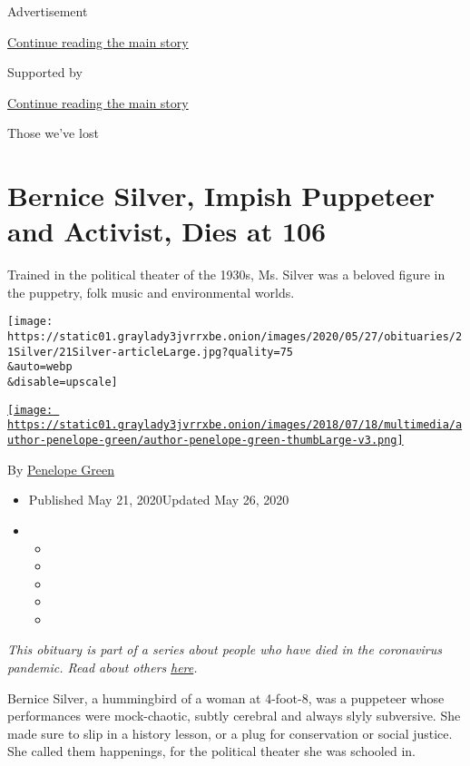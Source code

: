 Advertisement

\protect\hyperlink{after-top}{Continue reading the main story}

Supported by

\protect\hyperlink{after-sponsor}{Continue reading the main story}

Those we've lost

\hypertarget{bernice-silver-impish-puppeteer-and-activist-dies-at-106}{%
\section{Bernice Silver, Impish Puppeteer and Activist, Dies at
106}\label{bernice-silver-impish-puppeteer-and-activist-dies-at-106}}

Trained in the political theater of the 1930s, Ms. Silver was a beloved
figure in the puppetry, folk music and environmental worlds.

\texttt{[image: https://static01.graylady3jvrrxbe.onion/images/2020/05/27/obituaries/21Silver/21Silver-articleLarge.jpg?quality=75\\\&auto=webp\\\&disable=upscale]}

\href{https://www.nytimes3xbfgragh.onion/by/penelope-green}{\texttt{[image: https://static01.graylady3jvrrxbe.onion/images/2018/07/18/multimedia/author-penelope-green/author-penelope-green-thumbLarge-v3.png]}}

By \href{https://www.nytimes3xbfgragh.onion/by/penelope-green}{Penelope
Green}

\begin{itemize}
\item
  Published May 21, 2020Updated May 26, 2020
\item
  \begin{itemize}
  \item
  \item
  \item
  \item
  \item
  \end{itemize}
\end{itemize}

\emph{This obituary is part of a series about people who have died in
the coronavirus pandemic. Read about others}
\href{https://www.nytimes3xbfgragh.onion/series/people-who-have-died-of-the-coronavirus}{\emph{here}}\emph{.}

Bernice Silver, a hummingbird of a woman at 4-foot-8, was a puppeteer
whose performances were mock-chaotic, subtly cerebral and always slyly
subversive. She made sure to slip in a history lesson, or a plug for
conservation or social justice. She called them happenings, for the
political theater she was schooled in.

